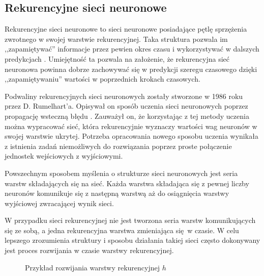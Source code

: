 \documentclass[10pt,a4paper]{article}
\begin{document}
\subsection{Rekurencyjne sieci neuronowe}
Rekurencyjne sieci neuronowe to sieci neuronowe posiadające pętlę sprzężenia zwrotnego w swojej warstwie rekurencyjnej. Taka struktura pozwala im ,,zapamiętywać'' informacje przez pewien okres czasu i wykorzystywać w dalszych predykcjach \cite{reviewOfANN2018}. Umiejętność ta pozwala na założenie, że rekurencyjna sieć neuronowa powinna dobrze zachowywać się w predykcji szeregu czasowego dzięki ,,zapamiętywaniu'' wartości w poprzednich krokach czasowych. 

Podwaliny rekurencyjnych sieci neuronowych zostały stworzone w 1986 roku przez D. Rumelhart'a. Opisywał on sposób uczenia sieci neuronowych poprzez propagację wsteczną błędu \cite{rumelhart1986learning}. Zauważył on, że korzystając z tej metody uczenia można wypracować sieć, która rekurencyjnie wyznaczy wartości wag neuronów w swojej warstwie ukrytej. Potrzeba opracowania nowego sposobu uczenia wynikała z istnienia zadań niemożliwych do rozwiązania poprzez proste połączenie jednostek wejściowych z wyjściowymi.

Powszechnym sposobem myślenia o strukturze sieci neuronowych jest seria warstw składających się na sieć. Każda warstwa składająca się z pewnej liczby neuronów komunikuje się z następną warstwą aż do osiągnięcia warstwy wyjściowej zwracającej wynik sieci. 

W przypadku sieci rekurencyjnej nie jest tworzona seria warstw komunikujących się ze sobą, a jedna rekurencyjna warstwa zmieniająca się w czasie. W celu lepszego zrozumienia struktury i sposobu działania takiej sieci często dokonywany jest proces rozwijania w czasie warstwy rekurencyjnej.

\begin{figure}[!ht]
	\centering
	\caption{Przykład rozwijania warstwy rekurencyjnej $h$}
	\label{figure:unfolded_rnn}
\end{figure}
\FloatBarrier
\end{document}
